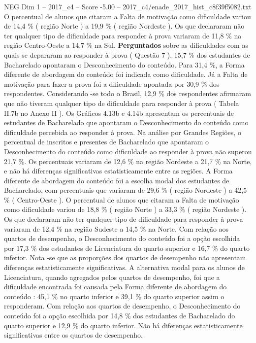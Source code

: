 \begin{textsample}{NEG Dim 1 – 2017\_c4 – Score -5.00 – 2017\_c4/enade\_2017\_hist\_c8f39f5082.txt}
O percentual de alunos que citaram a Falta de motivação como dificuldade variou de 14,4 \% ( região Norte ) a 19,9 \% ( região Nordeste ).
Os que declararam não ter qualquer tipo de dificuldade para responder à prova variaram de 11,8 \% na região Centro-Oeste a 14,7 \% na Sul. \textbf{Perguntados} sobre as dificuldades com as quais se depararam ao responder à prova ( Questão 7 ), 15,7 \% dos estudantes de Bacharelado apontaram o Desconhecimento do conteúdo.
Para 31,4 \%, a Forma diferente de abordagem do conteúdo foi indicada como dificuldade.
Já a Falta de motivação para fazer a prova foi a dificuldade apontada por 30,9 \% dos respondentes.
Considerando -se todo o Brasil, 12,9 \% dos respondentes afirmaram que não tiveram qualquer tipo de dificuldade para responder à prova ( Tabela II.7b no Anexo II ).
Os Gráficos 4.13b e 4.14b apresentam os percentuais de estudantes de Bacharelado que apontaram o Desconhecimento do conteúdo como dificuldade percebida ao responder à prova.
Na análise por Grandes Regiões, o percentual de inscritos e presentes de Bacharelado que apontaram o Desconhecimento do conteúdo como dificuldade ao responder à prova não superou 21,7 \%.
Os percentuais variaram de 12,6 \% na região Nordeste a 21,7 \% na Norte, e não há diferenças significativas estatisticamente entre as regiões.
A Forma diferente de abordagem do conteúdo foi a escolha modal dos estudantes de Bacharelado, com percentuais que variaram de 29,6 \% ( região Nordeste ) a 42,5 \% ( Centro-Oeste ).
O percentual de alunos que citaram a Falta de motivação como dificuldade variou de 18,8 \% ( região Norte ) a 33,3 \% ( região Nordeste ).
Os que declararam não ter qualquer tipo de dificuldade para responder à prova variaram de 12,4 \% na região Sudeste a 14,5 \% na Norte.
Com relação aos quartos de desempenho, o Desconhecimento do conteúdo foi a opção escolhida por 17,3 \% dos estudantes de Licenciatura do quarto superior e 16,7 \% do quarto inferior.
Nota -se que as proporções dos quartos de desempenho não apresentam diferenças estatisticamente significativas.
A alternativa modal para os alunos de Licenciatura, quando agregados pelos quartos de desempenho, foi que a dificuldade encontrada foi causada pela Forma diferente de abordagem do conteúdo : 45,1 \% no quarto inferior e 39,1 \% do quarto superior assim o responderam.
Com relação aos quartos de desempenho, o Desconhecimento do conteúdo foi a opção escolhida por 14,8 \% dos estudantes de Bacharelado do quarto superior e 12,9 \% do quarto inferior.
Não há diferenças estatisticamente significativas entre os quartos de desempenho.

\end{textsample}
